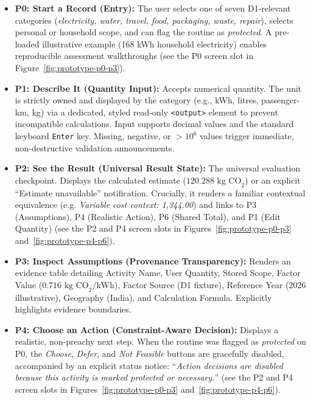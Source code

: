 \documentclass[12pt,a4paper]{article}
\newcommand{\code}[1]{\texttt{#1}}
\providecommand{\rupee}{\text{INR~}}
\begin{document}
\begin{itemize}[leftmargin=*]
  \item \textbf{P0: Start a Record (Entry):} The user selects one of seven D1-relevant categories (\emph{electricity, water, travel, food, packaging, waste, repair}), selects personal or household scope, and can flag the routine as \emph{protected}. A pre-loaded illustrative example (168 kWh household electricity) enables reproducible assessment walkthroughs (see the P0 screen slot in Figure~\ref{fig:prototype-p0-p3}).
  
  \item \textbf{P1: Describe It (Quantity Input):} Accepts numerical quantity. The unit is strictly owned and displayed by the category (e.g., kWh, litres, passenger-km, kg) via a dedicated, styled read-only \code{<output>} element to prevent incompatible calculations. Input supports decimal values and the standard keyboard \code{Enter} key. Missing, negative, or $>10^6$ values trigger immediate, non-destructive validation announcements.
  
  \item \textbf{P2: See the Result (Universal Result State):} The universal evaluation checkpoint. Displays the calculated estimate ($120.288\text{ kg CO}_2$) or an explicit ``Estimate unavailable'' notification. Crucially, it renders a familiar contextual equivalence (e.g. \emph{Variable cost context: \rupee 1,344.00}) and links to P3 (Assumptions), P4 (Realistic Action), P6 (Shared Total), and P1 (Edit Quantity) (see the P2 and P4 screen slots in Figures~\ref{fig:prototype-p0-p3} and~\ref{fig:prototype-p4-p6}).
  
  \item \textbf{P3: Inspect Assumptions (Provenance Transparency):} Renders an evidence table detailing Activity Name, User Quantity, Stored Scope, Factor Value ($0.716\text{ kg CO}_2\text{/kWh}$), Factor Source (D1 fixture), Reference Year (2026 illustrative), Geography (India), and Calculation Formula. Explicitly highlights evidence boundaries.
  
  \item \textbf{P4: Choose an Action (Constraint-Aware Decision):} Displays a realistic, non-preachy next step. When the routine was flagged as \emph{protected} on P0, the \emph{Choose}, \emph{Defer}, and \emph{Not Feasible} buttons are gracefully disabled, accompanied by an explicit status notice: ``\emph{Action decisions are disabled because this activity is marked protected or necessary.}'' (see the P2 and P4 screen slots in Figures~\ref{fig:prototype-p0-p3} and~\ref{fig:prototype-p4-p6}).
  

\end{itemize}
\end{document}
